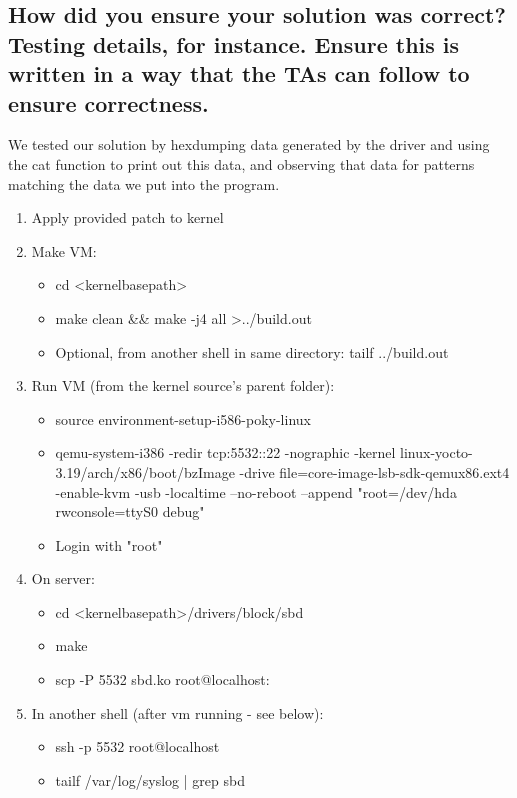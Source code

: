 \documentclass[onecolumn, draftclsnofoot,10pt, compsoc]{IEEEtran}
\begin{document}
\subsection{How did you ensure your solution was correct? Testing details, for instance. Ensure this is written in a way that the TAs can follow to ensure correctness.}
We tested our solution by hexdumping data generated by the driver and using the cat function to print out this data, and observing that data for patterns matching the data we put into the program.

\begin{enumerate}
    \item Apply provided patch to kernel
	\item Make VM:
	\begin{itemize}
	    \item cd \textless kernel\textunderscore base\textundersore path\textgreater
        \item make clean && make -j4 all \textgreater ../build.out
        \item Optional, from another shell in same directory: tailf ../build.out
	\end{itemize}

    \item Run VM (from the kernel source's parent folder):
    \begin{itemize}
        \item source environment-setup-i586-poky-linux
        \item qemu-system-i386 -redir tcp:5532::22 -nographic -kernel linux-yocto-3.19/arch/x86/boot/bzImage -drive file=core-image-lsb-sdk-qemux86.ext4 -enable-kvm -usb -localtime --no-reboot --append "root=/dev/hda rwconsole=ttyS0 debug"
        \item Login with "root"
    \end{itemize}
    
    \item On server:
    \begin{itemize}
        \item cd \textless kernel\textunderscore base\textundersore path\textgreater /drivers/block/sbd
        \item make
        \item scp -P 5532 sbd.ko root@localhost:~
    \end{itemize}

    \item In another shell (after vm running - see below):
    \begin{itemize}
        \item ssh -p 5532 root@localhost
        \item tailf /var/log/syslog | grep sbd
    \end{itemize}


\end{enumerate}
\end{document}
